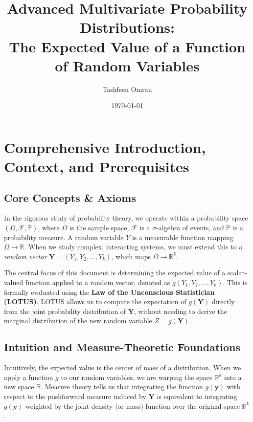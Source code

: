 \documentclass[11pt, a4paper]{article}
\theoremstyle{definition}
\theoremstyle{remark}
\newcommand{\R}{\mathbb{R}}
\newcommand{\Prob}{\mathbb{P}}
\newcommand{\F}{\mathcal{F}}
\begin{document}
\title{\textbf{Advanced Multivariate Probability Distributions: \\ The Expected Value of a Function of Random Variables}}
\author{Tashfeen Omran}
\date{\today}

\maketitle
\tableofcontents
\newpage

\section{Comprehensive Introduction, Context, and Prerequisites}

\subsection{Core Concepts \& Axioms}
In the rigorous study of probability theory, we operate within a probability space $(\Omega, \F, \Prob)$, where $\Omega$ is the sample space, $\F$ is a $\sigma$-algebra of events, and $\Prob$ is a probability measure. A random variable $Y$ is a measurable function mapping $\Omega \to \R$. When we study complex, interacting systems, we must extend this to a \textit{random vector} $\mathbf{Y} = (Y_1, Y_2, \dots, Y_k)$, which maps $\Omega \to \R^k$.

The central focus of this document is determining the expected value of a scalar-valued function applied to a random vector, denoted as $g(Y_1, Y_2, \dots, Y_k)$. This is formally evaluated using the \textbf{Law of the Unconscious Statistician (LOTUS)}. LOTUS allows us to compute the expectation of $g(\mathbf{Y})$ directly from the joint probability distribution of $\mathbf{Y}$, without needing to derive the marginal distribution of the new random variable $Z = g(\mathbf{Y})$.

\subsection{Intuition and Measure-Theoretic Foundations}
Intuitively, the expected value is the center of mass of a distribution. When we apply a function $g$ to our random variables, we are warping the space $\R^k$ into a new space $\R$. Measure theory tells us that integrating the function $g(\mathbf{y})$ with respect to the pushforward measure induced by $\mathbf{Y}$ is equivalent to integrating $g(\mathbf{y})$ weighted by the joint density (or mass) function over the original space $\R^k$. 
\end{document}

